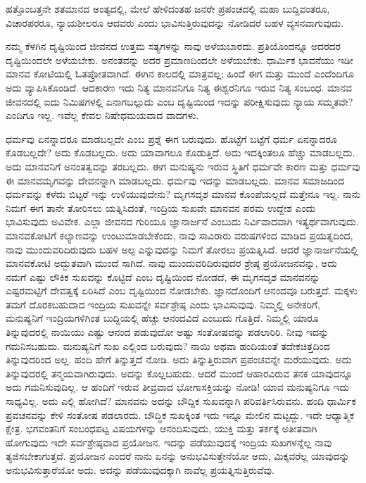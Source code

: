 ಹತ್ತೊಂಬತ್ತನೇ ಶತಮಾನದ ಅಂತ್ಯದಲ್ಲಿ, ಮೇಲೆ ಹೇಳಿದಂತಹ ಜನರೇ ಪ್ರಪಂಚದಲ್ಲಿ ಮಹಾ ಬುದ್ದಿವಂತರೂ, ವಿಚಾರಪರರೂ, ನ್ಯಾಯಶೀಲರೂ ಆದವರು ಎಂದು ಭಾವಿಸುತ್ತಿರುವುದನ್ನು ನೋಡಿದರೆ ಬಹಳ ವ್ಯಸನವಾಗುವುದು.

ನಮ್ಮ ಕೆಳಗಿನ ದೃಷ್ಟಿಯಿಂದ ಜೀವನದ ಉತ್ತಮ ಸತ್ಯಗಳನ್ನು ನಾವು ಅಳೆಯಬಾರದು. ಪ್ರತಿಯೊಂದನ್ನೂ ಅದರದರ ದೃಷ್ಟಿಯಿಂದಲೇ ಅಳೆಯಬೇಕು. ಅನಂತವನ್ನು ಅದರ ಪ್ರಮಾಣದಿಂದಲೇ ಅಳೆಯಬೇಕು. ಧಾರ್ಮಿಕ ಭಾವನೆಯು ಇಡೀ ಮಾನವ ಕೋಟಿಯಲ್ಲಿ ಓತಪ್ರೋತವಾಗಿದೆ. ಈಗಿನ ಕಾಲದಲ್ಲಿ ಮಾತ್ರವಲ್ಲ; ಹಿಂದೆ ಈಗ ಮತ್ತು ಮುಂದೆ ಎಂದೆಂದಿಗೂ ಅದು ವ್ಯಾಪಿಸಿಕೊಂಡಿದೆ. ಆದಕಾರಣ ಇದು ನಿತ್ಯ ಮಾನವನಿಗೂ ನಿತ್ಯ ಈಶ್ವರನಿಗೂ ಇರುವ ನಿತ್ಯ ಸಂಬಂಧ. ಮಾನವ ಜೀವನದಲ್ಲಿ ಐದು ನಿಮಿಷಗಳಲ್ಲಿ ಏನಾಗಬಲ್ಲುದು ಎಂಬ ದೃಷ್ಟಿಯಿಂದ ಇದನ್ನು ಪರೀಕ್ಷಿಸುವುದು ನ್ಯಾಯ ಸಮ್ಮತವೇ? ಎಂದಿಗೂ ಇಲ್ಲ. ಇವೆಲ್ಲ ಕೇವಲ ನಿಷೇಧಮಯವಾದ ವಾದಗಳು.

ಧರ್ಮವು ಏನನ್ನಾದರೂ ಮಾಡಬಲ್ಲದೇ ಎಂಬ ಪ್ರಶ್ನೆ ಈಗ ಬರುವುದು. ಹೊಟ್ಟೆಗೆ ಬಟ್ಟೆಗೆ ಧರ್ಮ ಏನನ್ನಾದರೂ ಕೊಡಬಲ್ಲದೇ? ಅದು ಕೊಡಬಲ್ಲದು. ಅದು ಯಾವಾಗಲೂ ಕೊಡುತ್ತಿದೆ. ಅದು ಇದಕ್ಕಿಂತಲೂ ಹೆಚ್ಚು ಮಾಡಬಲ್ಲದು. ಅದು ಮಾನವನಿಗೆ ಅನಂತತ್ವವನ್ನು ತರಬಲ್ಲದು. ಈಗ ಮನುಷ್ಯನು ಇರುವ ಸ್ಥಿತಿಗೆ ಧರ್ಮವೇ ಕಾರಣ ಮತ್ತು ಧರ್ಮವು ಈ ಮಾನವಮೃಗವನ್ನು ದೇವನನ್ನಾಗಿ ಮಾಡಬಲ್ಲದು. ಧರ್ಮವು ಇದನ್ನು ಮಾಡಬಲ್ಲದು. ಮಾನವ ಸಮಾಜದಿಂದ ಧರ್ಮವನ್ನು ಕಳೆದು ಬಿಟ್ಟರೆ ಇನ್ನು ಉಳಿಯುವುದೇನು? ಮೃಗಸದೃಶ ಮಾನವ ಕೊಂಪೆಯಲ್ಲದೆ ಮತ್ತೇನೂ ಇಲ್ಲ. ನಾನು ನಿಮಗೆ ಈಗ ತಾನೇ ತೋರಿಸಲು ಯತ್ನಿಸಿದಂತೆ, ಇಂದ್ರಿಯ ಸುಖವೇ ಮಾನವನ ಪರಮ ಉದ್ದೇಶ ಎಂದು ಭಾವಿಸುವುದು ಅವಿವೇಕ. ಎಲ್ಲಾ ಜೀವನದ ಗುರಿಯೂ ಜ್ಞಾನಾರ್ಜನೆ ಎಂಬುದು ನಿರ್ವಿವಾದವಾಗಿ ಇತ್ಯರ್ಥವಾಗುವುದು. ಮಾನವಕೋಟಿಗೆ ಕಲ್ಯಾಣವನ್ನು ಉಂಟುಮಾಡಬೇಕೆಂದು, ನಾವು ಸಾವಿರಾರು ವರುಷಗಳಿಂದ ಮಾಡಿದ ಪ್ರಯತ್ನದಿಂದ, ನಾವು ಮುಂದುವರಿದಿರುವುದು ಬಹಳ ಅಲ್ಪ ಎನ್ನುವುದನ್ನು ನಿಮಗೆ ತೋರಲು ಪ್ರಯತ್ನಿಸಿದೆ. ಆದರೆ ಜ್ಞಾನಾರ್ಜನೆಯಲ್ಲಿ ಮಾನವಕೋಟಿ ಅದ್ಭುತವಾಗಿ ಮುಂದೆ ಸಾಗಿದೆ. ನಾವು ಮುಂದುವರಿದಿರುವುದರ ಶ್ರೇಷ್ಠ ಪ್ರಯೋಜನವನ್ನು, ಅದು ನಮಗೆ ಎಷ್ಟು ಲೌಕಿಕ ಸುಖವನ್ನು ಕೊಟ್ಟಿದೆ ಎಂಬ ದೃಷ್ಟಿಯಿಂದ ನೋಡದೆ, ಈ ಮೃಗಸದೃಶ ಮಾನವನನ್ನು ಎಷ್ಟರಮಟ್ಟಿಗೆ ದೇವತ್ವಕ್ಕೆ ಏರಿಸಿದೆ ಎಂಬ ದೃಷ್ಟಿಯಿಂದ ನೋಡಬೇಕು. ಜ್ಞಾನದೊಂದಿಗೆ ಆನಂದವೂ ಬರುತ್ತದೆ. ಮಕ್ಕಳು ತಮಗೆ ದೊರಕಬಹುದಾದ ಇಂದ್ರಿಯ ಸುಖವನ್ನೇ ಸರ್ವಶ್ರೇಷ್ಠ ಎಂದು ಭಾವಿಸುವುವು. ನಿಮ್ಮಲ್ಲಿ ಅನೇಕರಿಗೆ, ಮನುಷ್ಯನಿಗೆ ಇಂದ್ರಿಯಗಳಿಗಿಂತ ಬುದ್ದಿಯಲ್ಲಿ ಹೆಚ್ಚು ಆನಂದವಿದೆ ಎಂಬುದು ಗೊತ್ತಿದೆ. ನಿಮ್ಮಲ್ಲಿ ಯಾರೂ ತಿನ್ನುವುದರಲ್ಲಿ ನಾಯಿಯು ಎಷ್ಟು ಆನಂದ ಪಡುವುದೋ ಅಷ್ಟು ಸಂತೋಷವನ್ನು ಪಡಲಾರಿರಿ. ನೀವು ಇದನ್ನು ಗಮನಿಸಬಹುದು. ಮನುಷ್ಯನಿಗೆ ಸುಖ ಎಲ್ಲಿಂದ ಬರುವುದು? ನಾಯಿ ಅಥವಾ ಹಂದಿಯಂತೆ ತದೇಕಚಿತ್ತದಿಂದ ತಿನ್ನುವುದರಿಂದ ಅಲ್ಲ. ಹಂದಿ ಹೇಗೆ ತಿನ್ನುತ್ತದೆ ನೋಡಿ. ಅದು ತಿನ್ನುತ್ತಿರುವಾಗ ಪ್ರಪಂಚವನ್ನೇ ಮರೆಯುವುದು. ಅದು ತಿನ್ನುವುದರಲ್ಲಿ ತನ್ಮಯವಾಗಿರುವುದು. ಅದನ್ನು ಕೊಲ್ಲಬಹುದು. ಆದರೆ ಮುಂದೆ ಆಹಾರವಿರುವ ತನಕ ಯಾವುದನ್ನೂ ಅದು ಗಮನಿಸುವುದಿಲ್ಲ. ಆ ಹಂದಿಗೆ ಇರುವ ತೀವ್ರವಾದ ಭೋಗಾಸಕ್ತಿಯನ್ನು ನೋಡಿ! ಯಾವ ಮನುಷ್ಯನಿಗೂ ಇದು ಸಾಧ್ಯವಿಲ್ಲ. ಅದು ಎಲ್ಲಿ ಹೋಗಿದೆ? ಮಾನವನು ಅದನ್ನು ಬೌದ್ದಿಕ ಸುಖವನ್ನಾಗಿ ಪರಿವರ್ತಿಸಿರುವನು. ಹಂದಿ ಧಾರ್ಮಿಕ ಪ್ರವಚನವನ್ನು ಕೇಳಿ ಸಂತೋಷ ಪಡಲಾರದು. ಬೌದ್ಧಿಕ ಸುಖಕ್ಕಿಂತ ಇದು ಇನ್ನೂ ಮೇಲಿನ ಮಟ್ಟದ್ದು. ಇದೇ ಆಧ್ಯಾತ್ಮಿಕ ಕ್ಷೇತ್ರ. ಭಗವಂತನಿಗೆ ಸಂಬಂಧಪಟ್ಟ ವಿಷಯಗಳನ್ನು ಆನಂದಿಸುವುದು, ಯುಕ್ತಿ ಮತ್ತು ತರ್ಕಕ್ಕೆ ಅತೀತವಾಗಿ ಹೋಗುವುದು ಇದೇ ಸರ್ವಶ್ರೇಷ್ಠವಾದ ಪ್ರಯೋಜನ. ಇದನ್ನು ಪಡೆಯುವುದಕ್ಕೆ ಇಂದ್ರಿಯ ಸುಖಗಳನ್ನೆಲ್ಲ ನಾವು ತ್ಯಜಿಸಬೇಕಾಗುತ್ತದೆ. ಪ್ರಯೋಜನ ಎಂದರೆ ನಾನು ಏನನ್ನು ಅನುಭವಿಸುತ್ತೇನೆಯೋ ಅದು, ಮಿಕ್ಕವರೆಲ್ಲ ಯಾವುದನ್ನು ಅನುಭವಿಸುತ್ತಾರೆಯೋ ಅದು. ಅದನ್ನು ಪಡೆಯುವುದಕ್ಕಾಗಿ ನಾವೆಲ್ಲ ಪ್ರಯತ್ನಿಸುತ್ತಿರುವೆವು.

